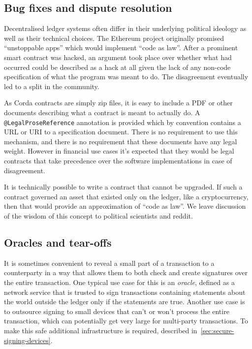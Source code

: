 \documentclass{article}
\begin{document}
\subsection{Bug fixes and dispute resolution}\label{subsec:bug-fixes-and-dispute-resolution}

Decentralised ledger systems often differ in their underlying political ideology as well as their technical
choices. The Ethereum project originally promised ``unstoppable apps'' which would implement ``code as law''. After
a prominent smart contract was hacked\cite{TheDAOHack}, an argument took place over whether what had occurred could
be described as a hack at all given the lack of any non-code specification of what the program was meant to do. The
disagreement eventually led to a split in the community.

As Corda contracts are simply zip files, it is easy to include a PDF or other documents describing what a contract
is meant to actually do. A \texttt{@LegalProseReference} annotation is provided which by convention contains a URL
or URI to a specification document. There is no requirement to use this mechanism, and there is no requirement that
these documents have any legal weight. However in financial use cases it's expected that they would be legal
contracts that take precedence over the software implementations in case of disagreement.

It is technically possible to write a contract that cannot be upgraded. If such a contract governed an asset that
existed only on the ledger, like a cryptocurrency, then that would provide an approximation of ``code as law''. We
leave discussion of the wisdom of this concept to political scientists and reddit.


\subsection{Oracles and tear-offs}\label{sec:tear-offs}

It is sometimes convenient to reveal a small part of a transaction to a counterparty in a way that allows them to
both check and create signatures over the entire transaction. One typical use case for this is an \emph{oracle},
defined as a network service that is trusted to sign transactions containing statements about the world outside the
ledger only if the statements are true. Another use case is to outsource signing to small devices that can't or
won't process the entire transaction, which can potentially get very large for multi-party transactions. To make
this safe additional infrastructure is required, described in~\cref{sec:secure-signing-devices}.
\end{document}
